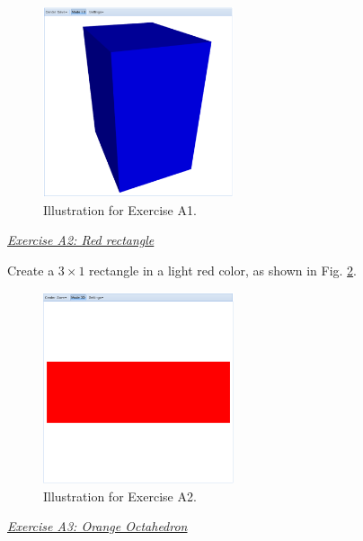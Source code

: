 \documentclass[article,A4,12pt]{llncs}
\begin{document}
\newpage

\begin{figure}[!ht]
\begin{center}
\includegraphics[width=0.5\textwidth]{img/a1-blue-brick.png}
\end{center}
\vspace{-2mm}
\caption{Illustration for Exercise A1.}
\label{fig:a1}
\end{figure}


\noindent
\underline{\em Exercise A2: Red rectangle}

Create a $3 \times 1$ rectangle in a light
red color, as shown in Fig. \ref{fig:a2}.

\begin{figure}[!ht]
\begin{center}
\includegraphics[width=0.5\textwidth]{img/a2-red-rectangle.png}
\end{center}
\vspace{-2mm}
\caption{Illustration for Exercise A2.}
\label{fig:a2}
\vspace{-1cm}
\end{figure}
\newpage
\noindent
\underline{\em Exercise A3: Orange Octahedron}
\end{document}
